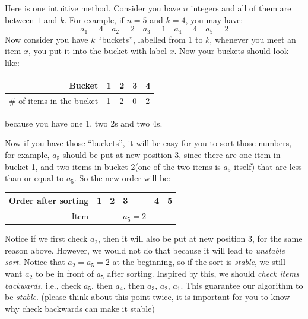 \begin{spacing}{1.3}
    Here is one intuitive method. Consider you have $n$ integers and all of them 
    are between $1$ and $k$. For example, if $n=5$ and $k=4$, you may have:
    $$a_1=4\quad a_2=2\quad a_3=1\quad a_4=4\quad a_5=2$$
    Now consider you have $k$ ``buckets'', labelled from $1$ to $k$, whenever you meet 
    an item $x$, you put it into the bucket with label $x$. Now your buckets should look like:
    \begin{center}
        \begin{tabular}{r|C{2cm}|C{2cm}|C{2cm}|C{2cm}}
            \hline
            Bucket & 1 & 2 & 3 & 4\\\hline
            \# of items in the bucket & 1 & 2 & 0 & 2\\\hline
        \end{tabular}
    \end{center}
    because you have one 1, two 2s and two 4s.

    Now if you have those ``buckets'', it will be easy for you to sort those numbers,
    for example, $a_5$ should be put at new position 3, since there are 
    one item in bucket 1, and two items in bucket 2(one of the two items is $a_5$ itself)
    that are less than or equal to $a_5$. So the new order will be:
    \begin{center}
        \begin{tabular}{r|C{2cm}|C{2cm}|C{2cm}|C{2cm}|C{2cm}}
            \hline
            Order after sorting & 1 & 2 & 3 & 4 & 5\\\hline
            Item &  &  & $a_5=2$ & & \\\hline
        \end{tabular}
    \end{center}
    Notice if we first check $a_2$, then it will also be put at new position 3, 
    for the same reason above. However, we would not do that because it will 
    lead to {\it unstable sort}. Notice that $a_2=a_5=2$ at the beginning, 
    so if the sort is {\it stable}, we still want $a_2$ to be in front of $a_5$ 
    after sorting. Inspired by this, we should {\it check items backwards},
    i.e., check $a_5$, then $a_4$, then $a_3$, $a_2$, $a_1$. This guarantee
    our algorithm to be {\it stable}. (please think about this point twice,
    it is important for you to know why check backwards can make it stable)


\end{spacing}
